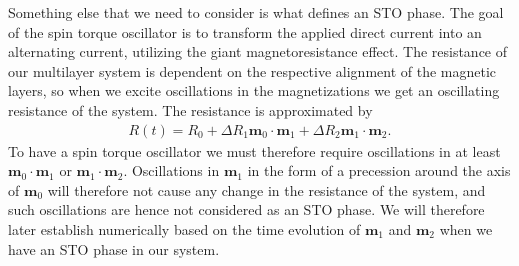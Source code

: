 Something else that we need to consider is what defines an STO phase. The goal of the spin torque oscillator is to transform the applied direct current into an alternating current, utilizing the giant magnetoresistance effect. The resistance of our multilayer system is dependent on the respective alignment of the magnetic layers, so when we excite oscillations in the magnetizations we get an oscillating resistance of the system. The resistance is approximated by
\begin{align}
    R(t) = R_0 + \Delta R_1\mathbold{m}_0\cdot\mathbold{m}_1 + \Delta R_2\mathbold{m}_1\cdot\mathbold{m}_2.
\end{align}
To have a spin torque oscillator we must therefore require oscillations in at least $\mathbold{m}_0\cdot\mathbold{m}_1$ or $\mathbold{m}_1\cdot\mathbold{m}_2$. Oscillations in $\mathbold{m}_1$ in the form of a precession around the axis of $\mathbold{m}_0$ will therefore not cause any change in the resistance of the system, and such oscillations are hence not considered as an STO phase. We will therefore later establish numerically based on the time evolution of $\mathbold{m}_1$ and $\mathbold{m}_2$ when we have an STO phase in our system.

